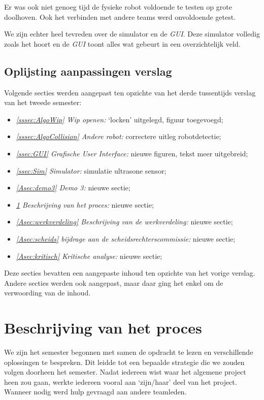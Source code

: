 \documentclass[eind]{penoverslag}
\begin{document}
Er was ook niet genoeg tijd de fysieke robot voldoende te testen op grote doolhoven. Ook het verbinden met andere teams werd onvoldoende getest.

We zijn echter heel tevreden over de simulator en de \textit{GUI}. Deze simulator volledig zoals het hoort en de \textit{GUI} toont alles wat gebeurt in een overzichtelijk veld.

\subsection{Oplijsting aanpassingen verslag}
\label{Assec:aanp3}
Volgende secties werden aangepast ten opzichte van het derde tussentijds verslag van het tweede semester:

\begin{itemize}
	\item \textit{\ref{sssec:AlgoWip} Wip openen:} `locken' uitgelegd, figuur toegevoegd;
	\item \textit{\ref{sssec:AlgoCollision} Andere robot:} correctere uitleg robotdetectie;
	\item \textit{\ref{ssec:GUI} Grafische User Interface:} nieuwe figuren, tekst meer uitgebreid;
	\item \textit{\ref{ssec:Sim} Simulator:} simulatie ultrasone sensor;
	\item \textit{\ref{Asec:demo3} Demo 3:} nieuwe sectie;
	\item \textit{\ref{Asec:beschrijvingProces} Beschrijving van het proces:} nieuwe sectie;
	\item \textit{\ref{Asec:werkverdeling} Beschrijving van de werkverdeling:} nieuwe sectie;
	\item \textit{\ref{Asec:scheids} bijdrage aan de scheidsrechterscommissie:} nieuwe sectie;
	\item \textit{\ref{Asec:kritisch} Kritische analyse:} nieuwe sectie;
\end{itemize}

Deze secties bevatten een aangepaste inhoud ten opzichte van het vorige verslag. Andere secties werden ook aangepast, maar daar ging het enkel om de verwoording van de inhoud.

\section{Beschrijving van het proces}
\label{Asec:beschrijvingProces}

We zijn het semester begonnen met samen de opdracht te lezen en verschillende oplossingen te bespreken. Dit leidde tot een bepaalde strategie \cite{Strategie} die we zouden volgen doorheen het semester. Nadat iedereen wist waar het algemene project heen zou gaan, werkte iedereen vooral aan `zijn/haar' deel van het project. Wanneer nodig werd hulp gevraagd aan andere teamleden.
\end{document}

